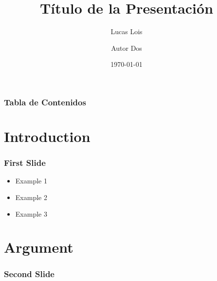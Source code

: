 \documentclass{beamer}
\title{Título de la Presentación}
\author[Lois]{
  Lucas Lois
  \and
  Autor Dos
}
\institute[]{Universidad Católica del Uruguay}
\date{\today}
\begin{document}
\frame{\titlepage}

\begin{frame}
\frametitle{Tabla de Contenidos}
\tableofcontents
\end{frame}

\section{Introduction}

\begin{frame}
  \frametitle{First Slide}

  \begin{itemize}
    \item<1> Example 1
    \item<2-> Example 2
    \item<3-> Example 3
  \end{itemize}
\end{frame}

\section{Argument}

\begin{frame}
  \frametitle{Second Slide}

  \blindtext
\end{frame}
\end{document}
